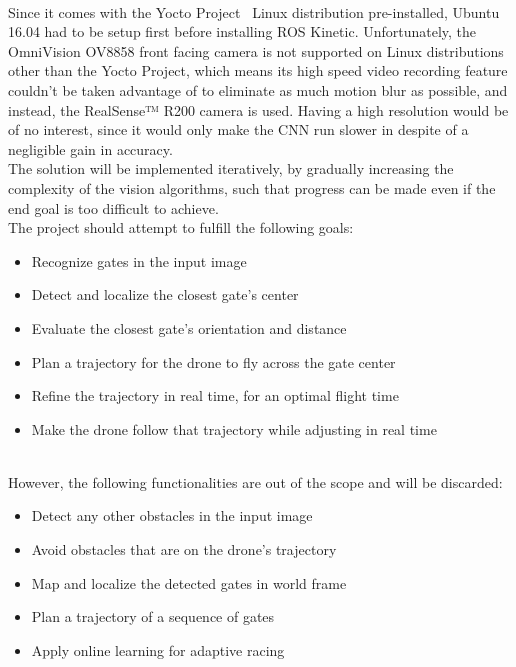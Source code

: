 ~\\Since it comes with the Yocto Project~\cite{Yocto} Linux distribution
pre-installed, Ubuntu 16.04 had to be setup first before installing ROS
Kinetic. Unfortunately, the OmniVision OV8858 front facing camera is not
supported on Linux distributions other than the Yocto Project, which means its
high speed video recording feature couldn't be taken advantage of to eliminate
as much motion blur as possible, and instead, the RealSense™ R200 camera is
used. Having a high resolution would be of no interest, since it would only
make the CNN run slower in despite of a negligible gain in accuracy.\\


The solution will be implemented iteratively, by gradually increasing the
complexity of the vision algorithms, such that progress can be made even if the
end goal is too difficult to achieve.\\

The project should attempt to fulfill the following goals:

\begin{itemize}
	\item{Recognize gates in the input image}
	\item{Detect and localize the closest gate's center}
	\item{Evaluate the closest gate's orientation and distance}
	\item{Plan a trajectory for the drone to fly across the gate center}
	\item{Refine the trajectory in real time, for an optimal flight time}
	\item{Make the drone follow that trajectory while adjusting in real time}
\end{itemize}
~\\
However, the following functionalities are out of the scope and will be
discarded:

\begin{itemize}
	\item{Detect any other obstacles in the input image}
	\item{Avoid obstacles that are on the drone's trajectory}
	\item{Map and localize the detected gates in world frame}
	\item{Plan a trajectory of a sequence of gates}
	\item{Apply online learning for adaptive racing}
\end{itemize}
